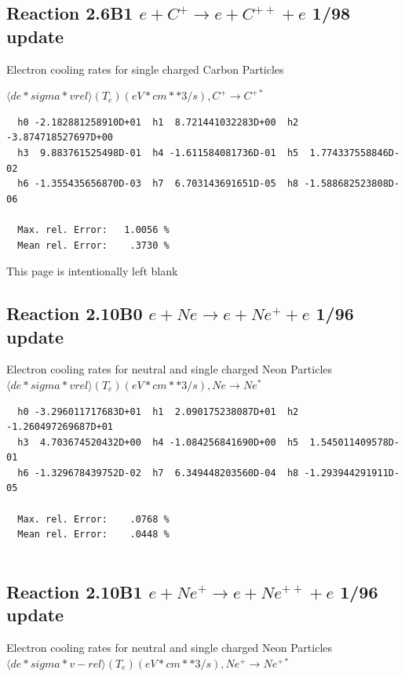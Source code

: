 \documentclass[12pt,dvips]{article}
\begin{document}
\subsection{
Reaction 2.6B1 $e + C^+ \rightarrow e + C^{++} + e  $ 1/98 update
}

 Electron cooling rates for single
 charged Carbon Particles

 $ \langle de*sigma*vrel \rangle(T_e)  (eV*cm**3/s), C^+ \rightarrow C^{+*} $


\begin{small}\begin{verbatim}
  h0 -2.182881258910D+01  h1  8.721441032283D+00  h2 -3.874718527697D+00
  h3  9.883761525498D-01  h4 -1.611584081736D-01  h5  1.774337558846D-02
  h6 -1.355435656870D-03  h7  6.703143691651D-05  h8 -1.588682523808D-06

  Max. rel. Error:   1.0056 %
  Mean rel. Error:    .3730 %

\end{verbatim}\end{small}

\newpage
This page is intentionally left blank
\newpage

\subsection{
Reaction 2.10B0 $e + Ne \rightarrow e + Ne^+ + e  $ 1/96 update
}

  Electron cooling rates for neutral and single
  charged Neon Particles
 $ \langle de*sigma*vrel \rangle(T_e)  (eV*cm**3/s), Ne  \rightarrow  Ne^*$

\begin{small}\begin{verbatim}
  h0 -3.296011717683D+01  h1  2.090175238087D+01  h2 -1.260497269687D+01
  h3  4.703674520432D+00  h4 -1.084256841690D+00  h5  1.545011409578D-01
  h6 -1.329678439752D-02  h7  6.349448203560D-04  h8 -1.293944291911D-05

  Max. rel. Error:    .0768 %
  Mean rel. Error:    .0448 %


\end{verbatim}\end{small}


\subsection{
Reaction 2.10B1 $ e + Ne^+ \rightarrow e + Ne^{++} + e $ 1/96 update
}

  Electron cooling rates for neutral and single
  charged Neon Particles
 $  \langle de*sigma*v-rel \rangle(T_e)  (eV*cm**3/s), Ne^+ \rightarrow Ne^{+*} $
\end{document}
